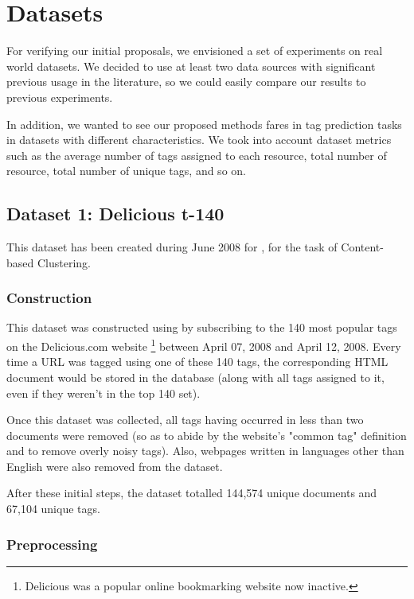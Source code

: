 \section{Datasets}\label{section:datasets}

For verifying our initial proposals, we envisioned a set of experiments on real world datasets. We decided to use at least two data sources with significant previous usage in the literature, so we could easily compare our results to previous experiments. 

In addition, we wanted to see our proposed methods fares in tag prediction tasks in datasets with different characteristics. We took into account dataset metrics such as the average number of tags assigned to each resource, total number of resource, total number of unique tags, and so on.

\subsection{Dataset 1: Delicious t-140}\label{subsec:dataset_1}

This dataset has been created during June 2008 for \cite{zubiaga_etal_2009}, for the task of Content-based Clustering.

\subsubsection{Construction}

This dataset was constructed using by subscribing to the 140 most popular tags on the Delicious.com website \footnote{Delicious was a popular online bookmarking website now inactive.} between April 07, 2008 and April 12, 2008.  Every time a URL was tagged using one of these 140 tags, the corresponding HTML document would be stored in the database (along with all tags assigned to it, even if they weren't in the top 140 set).

Once this dataset was collected, all tags having occurred in less than two documents were removed (so as to abide by the website's "common tag" definition and to remove overly noisy tags). Also, webpages written in languages other than English were also removed from the dataset.

After these initial steps, the dataset totalled 144,574 unique documents and 67,104 unique tags.

\subsubsection{Preprocessing}

